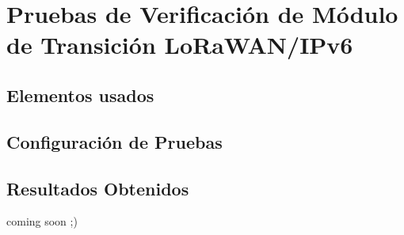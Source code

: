 \chapter{Pruebas de Verificación de Módulo de Transición LoRaWAN/IPv6}
\section{Elementos usados}
\section{Configuración de Pruebas}
\section{Resultados Obtenidos}
coming soon ;)